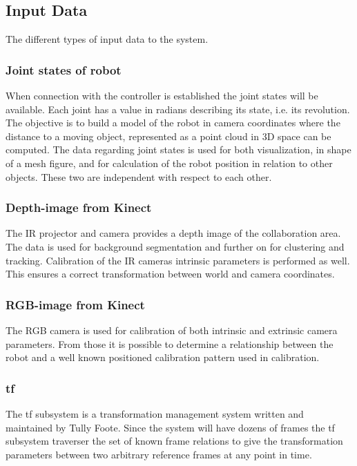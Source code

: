 \subsection{Input Data}
The different types of input data to the system.
\subsubsection{Joint states of robot}
When connection with the controller is established the joint states will be available. Each joint has a value in radians describing its state, i.e. its revolution. The objective is to build a model of the robot in camera coordinates where the distance to a moving object, represented as a point cloud in 3D space can be computed.
The data regarding joint states is used for both visualization, in shape of a mesh figure, and for calculation of the robot position in relation to other objects. These two are independent with respect to each other.

\subsubsection{Depth-image from Kinect}
The IR projector and camera provides a depth image of the collaboration area. The data is used for background segmentation and further on for clustering and tracking. Calibration of the IR cameras intrinsic parameters is performed as well. This ensures a correct transformation between world and camera coordinates.

\subsubsection{RGB-image from Kinect}
The RGB camera is used for calibration of both intrinsic and extrinsic camera parameters. From those it is possible to determine a relationship between the robot and a well known positioned calibration pattern used in calibration. 

\subsubsection{tf}
The tf subsystem is a transformation management system written and maintained by Tully Foote. Since the system will have dozens of frames the tf subsystem traverser the set of known frame relations to give the transformation parameters between two arbitrary reference frames at any point in time. 